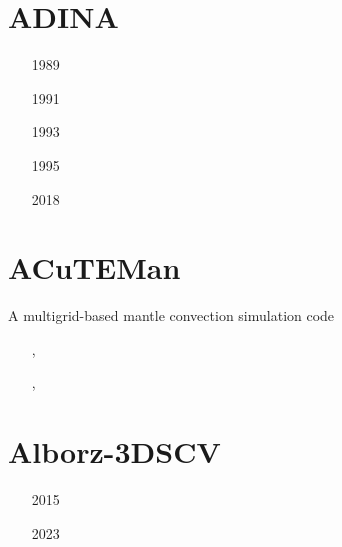 \section{ADINA} 

\begin{small}
\begin{itemize}
\item[1989] \textcite{niba89}
\item[1991] \textcite{bass91}
\item[1993] \textcite{bakp93}
\item[1995] \textcite{bass95}
\item[2018] \textcite{zhzz18}
\end{itemize}
\end{small}

\section{ACuTEMan} 
A multigrid-based mantle convection simulation code

\begin{small}
\begin{itemize}
\item[\twothousandfive]    \textcite{kame05}, \textcite{kaks05}
\item[\twothousandeight]   \textcite{dakk08}
\item[\twothousandfifteen] \textcite{miko15}, \textcite{kamo15}
\item[\twothousandtwenty]  \textcite{miko20} 
\end{itemize}
\end{small}

\section{Alborz-3DSCV} 

\begin{small}
\begin{itemize}
\item[2015] \textcite{shpe15} 
\item[2023] \textcite{shpy23}
\end{itemize}
\end{small}

